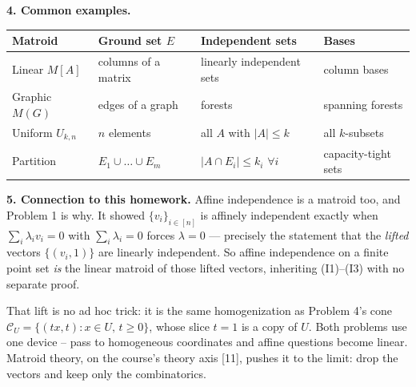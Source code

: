 \documentclass[10pt]{article}
\begin{document}
\textbf{4. Common examples.}

\begin{center}\small
\begin{tabular}{@{}llll@{}}
\toprule
Matroid & Ground set $E$ & Independent sets & Bases \\
\midrule
Linear $M[A]$ & columns of a matrix & linearly independent sets
  & column bases \\
Graphic $M(G)$ & edges of a graph & forests & spanning forests \\
Uniform $U_{k,n}$ & $n$ elements & all $A$ with $|A| \le k$
  & all $k$-subsets \\
Partition & $E_1 \cup \dots \cup E_m$ & $|A \cap E_i| \le k_i$
  $\forall i$ & capacity-tight sets \\
\bottomrule
\end{tabular}
\end{center}


\textbf{5. Connection to this homework.}
Affine independence is a matroid too, and Problem 1 is why. It showed
$\{v_i\}_{i \in [n]}$ is affinely independent exactly when
$\sum_i \lambda_i v_i = 0$ with $\sum_i \lambda_i = 0$ forces
$\lambda = 0$ --- precisely the statement that the \emph{lifted}
vectors $\{(v_i, 1)\}$ are linearly independent. So affine independence
on a finite point set \emph{is} the linear matroid of those lifted
vectors, inheriting (I1)--(I3) with no separate proof.

That lift is no ad hoc trick: it is the same homogenization as
Problem 4's cone $\mathcal{C}_U = \{(tx,t) : x \in U,\, t \ge 0\}$,
whose slice $t = 1$ is a copy of $U$. Both problems use one device --
pass to homogeneous coordinates and affine questions become linear.
Matroid theory, on the course's theory axis [11], pushes it to the
limit: drop the vectors and keep only the combinatorics.
\end{document}
